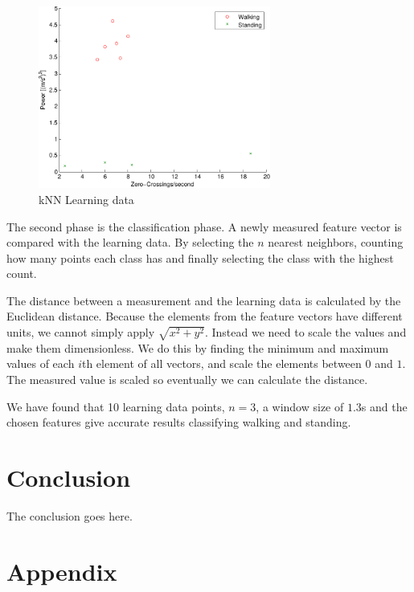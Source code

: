 \documentclass[journal]{IEEEtran}
\let\MYoriglatexcaption\caption
\renewcommand{\caption}[2][\relax]{\MYoriglatexcaption[#2]{#2}}
\begin{document}
\begin{figure}
  \centering
  \includegraphics[width=3in]{images/knn-data.pdf}
  \caption{kNN Learning data}
  \label{fig:knn-data}
\end{figure}

The second phase is the classification phase. A newly measured feature vector
is compared with the learning data. By selecting the $n$ nearest neighbors,
counting how many points each class has and finally selecting the class with
the highest count.

The distance between a measurement and the learning data is calculated by the
Euclidean distance. Because the elements from the feature vectors have
different units, we cannot simply apply $\sqrt{ x^2+y^2 }$. Instead we need to
scale the values and make them dimensionless. We do this by finding the minimum
and maximum values of each $i$th element of all vectors, and scale the elements
between $0$ and $1$. The measured value is scaled so eventually we can
calculate the distance.

We have found that 10 learning data points, $n=3$, a window size of $1.3$s
and the chosen features give accurate results classifying walking and standing.

\section{Conclusion}
The conclusion goes here.

\appendices
\section{Appendix}

\ifCLASSOPTIONcaptionsoff
  \newpage
\fi



\end{document}
